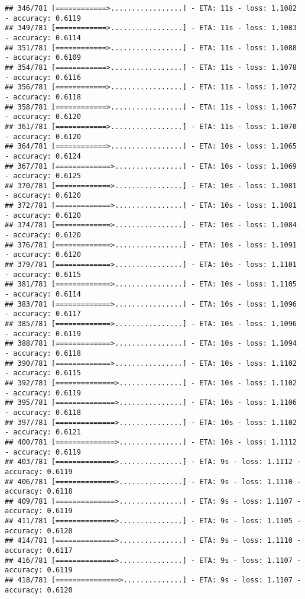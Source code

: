 \documentclass[
]{article}
\begin{document}
\begin{verbatim}
## 346/781 [============>.................] - ETA: 11s - loss: 1.1082 - accuracy: 0.6119
## 349/781 [============>.................] - ETA: 11s - loss: 1.1083 - accuracy: 0.6114
## 351/781 [============>.................] - ETA: 11s - loss: 1.1088 - accuracy: 0.6109
## 354/781 [============>.................] - ETA: 11s - loss: 1.1078 - accuracy: 0.6116
## 356/781 [============>.................] - ETA: 11s - loss: 1.1072 - accuracy: 0.6118
## 358/781 [============>.................] - ETA: 11s - loss: 1.1067 - accuracy: 0.6120
## 361/781 [============>.................] - ETA: 11s - loss: 1.1070 - accuracy: 0.6120
## 364/781 [============>.................] - ETA: 10s - loss: 1.1065 - accuracy: 0.6124
## 367/781 [=============>................] - ETA: 10s - loss: 1.1069 - accuracy: 0.6125
## 370/781 [=============>................] - ETA: 10s - loss: 1.1081 - accuracy: 0.6120
## 372/781 [=============>................] - ETA: 10s - loss: 1.1081 - accuracy: 0.6120
## 374/781 [=============>................] - ETA: 10s - loss: 1.1084 - accuracy: 0.6120
## 376/781 [=============>................] - ETA: 10s - loss: 1.1091 - accuracy: 0.6120
## 379/781 [=============>................] - ETA: 10s - loss: 1.1101 - accuracy: 0.6115
## 381/781 [=============>................] - ETA: 10s - loss: 1.1105 - accuracy: 0.6114
## 383/781 [=============>................] - ETA: 10s - loss: 1.1096 - accuracy: 0.6117
## 385/781 [=============>................] - ETA: 10s - loss: 1.1096 - accuracy: 0.6119
## 388/781 [=============>................] - ETA: 10s - loss: 1.1094 - accuracy: 0.6118
## 390/781 [=============>................] - ETA: 10s - loss: 1.1102 - accuracy: 0.6115
## 392/781 [==============>...............] - ETA: 10s - loss: 1.1102 - accuracy: 0.6119
## 395/781 [==============>...............] - ETA: 10s - loss: 1.1106 - accuracy: 0.6118
## 397/781 [==============>...............] - ETA: 10s - loss: 1.1102 - accuracy: 0.6121
## 400/781 [==============>...............] - ETA: 10s - loss: 1.1112 - accuracy: 0.6119
## 403/781 [==============>...............] - ETA: 9s - loss: 1.1112 - accuracy: 0.6119 
## 406/781 [==============>...............] - ETA: 9s - loss: 1.1110 - accuracy: 0.6118
## 409/781 [==============>...............] - ETA: 9s - loss: 1.1107 - accuracy: 0.6119
## 411/781 [==============>...............] - ETA: 9s - loss: 1.1105 - accuracy: 0.6120
## 414/781 [==============>...............] - ETA: 9s - loss: 1.1110 - accuracy: 0.6117
## 416/781 [==============>...............] - ETA: 9s - loss: 1.1107 - accuracy: 0.6119
## 418/781 [===============>..............] - ETA: 9s - loss: 1.1107 - accuracy: 0.6120

\end{verbatim}
\end{document}
